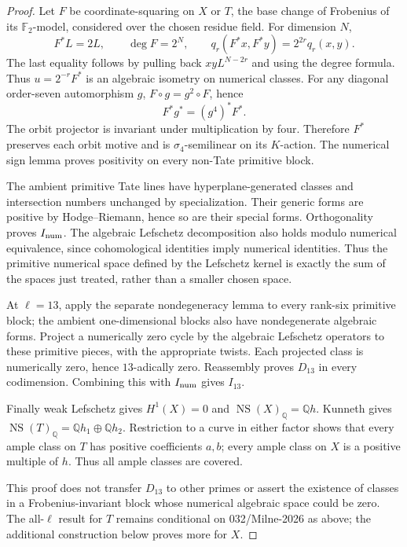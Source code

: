 \documentclass[11pt]{article}
\theoremstyle{remark}\newtheorem{remark}[theorem]{Remark}
\begin{document}
\begin{proof}
Let \(F\) be coordinate-squaring on \(X\) or \(T\), the base change
of Frobenius of its \(\mathbb F _2\)-model, considered over the chosen
residue field. For dimension \(N\),
\[
 F^*L=2L,\qquad \deg F=2^N,\qquad
 q_r(F^*x,F^*y)=2^{2r}q_r(x,y).
\]
The last equality follows by pulling back \(xyL^{N-2r}\) and using
the degree formula. Thus \(u=2^{-r}F^*\) is an algebraic isometry
on numerical classes. For any diagonal order-seven automorphism \(g\),
\(F\circ g=g^2\circ F\), hence
\[
 F^*g^*=(g^4)^*F^*.
\]
The orbit projector is invariant under multiplication by four.
Therefore \(F^*\) preserves each orbit motive and is
\(\sigma_4\)-semilinear on its \(K\)-action. The numerical sign
lemma proves positivity on every non-Tate primitive block.

The ambient primitive Tate lines have hyperplane-generated classes
and intersection numbers unchanged by specialization. Their generic
forms are positive by Hodge--Riemann, hence so are their special forms.
Orthogonality proves \(I_{\rm num}\). The algebraic Lefschetz
decomposition also holds modulo numerical equivalence, since
cohomological identities imply numerical identities. Thus the
primitive numerical space defined by the Lefschetz kernel is exactly
the sum of the spaces just treated, rather than a smaller chosen space.

At \(\ell=13\), apply the separate nondegeneracy lemma to every
rank-six primitive block; the ambient one-dimensional blocks also
have nondegenerate algebraic forms. Project a numerically zero cycle
by the algebraic Lefschetz operators to these primitive pieces,
with the appropriate twists. Each projected class is numerically
zero, hence \(13\)-adically zero. Reassembly proves \(D_{13}\)
in every codimension. Combining this with \(I_{\rm num}\) gives \(I_{13}\).

Finally weak Lefschetz gives \(H^1(X)=0\) and
\(\operatorname{NS}(X)_{\mathbb Q}=\mathbb Qh\). Kunneth gives
\(\operatorname{NS}(T)_{\mathbb Q}=\mathbb Qh_1\oplus\mathbb Qh_2\).
Restriction to a curve in either factor shows that every ample
class on \(T\) has positive coefficients \(a,b\); every ample class
on \(X\) is a positive multiple of \(h\). Thus all ample classes
are covered.

This proof does not transfer \(D_{13}\) to other primes or assert
the existence of classes in a Frobenius-invariant block whose
numerical algebraic space could be zero. The all-\(\ell\) result
for \(T\) remains conditional on 032/Milne-2026 as above;
the additional construction below proves more for \(X\).
\end{proof}
\end{document}
